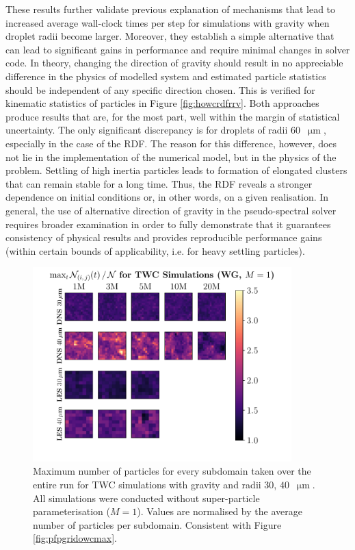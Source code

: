 \documentclass{pracamgren}
\begin{document}
These results further validate previous explanation of mechanisms that lead to increased average wall-clock times per step for simulations with gravity when droplet radii become larger.
Moreover, they establish a simple alternative that can lead to significant gains in performance and require minimal changes in solver code.
In theory, changing the direction of gravity should result in no appreciable difference in the physics of modelled system and estimated particle statistics should be independent of any specific direction chosen.
This is verified for kinematic statistics of particles in Figure \ref{fig:howcrdfrrv}.
Both approaches produce results that are, for the most part, well within the margin of statistical uncertainty.
The only significant discrepancy is for droplets of radii $60$~$\upmu\text{m}$, especially in the case of the RDF.
The reason for this difference, however, does not lie in the implementation of the numerical model, but in the physics of the problem.
Settling of high inertia particles leads to formation of elongated clusters that can remain stable for a long time.
Thus, the RDF reveals a stronger dependence on initial conditions or, in other words, on a given realisation.
In general, the use of alternative direction of gravity in the pseudo-spectral solver requires broader examination in order to fully demonstrate that it guarantees consistency of physical results and provides reproducible performance gains (within certain bounds of applicability, i.e. for heavy settling particles).

\begin{figure}[!h]
\centering
\includegraphics[width=10cm]{figures/3-23_pfpgridtwcmax.pdf}
\caption{
Maximum number of particles for every subdomain taken over the entire run for TWC simulations with gravity and radii $30$, $40$~$\upmu\text{m}$.
All simulations were conducted without super-particle parameterisation ($M=1$). 
Values are normalised by the average number of particles per subdomain.
Consistent with Figure \ref{fig:pfpgridowcmax}.
}
\label{fig:pfpgridtwcmax}
\end{figure}
\end{document}
